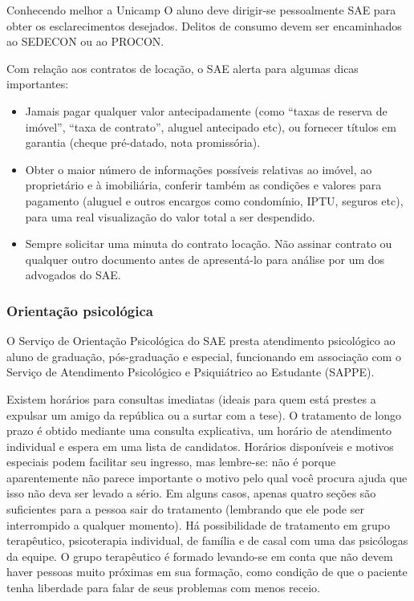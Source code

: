 \begin{story}{Conhecendo melhor a Unicamp}
O aluno deve dirigir-se pessoalmente SAE para obter os esclarecimentos desejados. Delitos de consumo devem ser encaminhados ao SEDECON ou ao PROCON.

Com relação aos contratos de locação, o SAE alerta para algumas dicas importantes:

\begin{itemize}
\item Jamais pagar qualquer valor antecipadamente (como ``taxas de reserva de imóvel'', ``taxa de contrato'', aluguel antecipado etc), ou fornecer títulos em garantia (cheque pré-datado, nota promissória).

\item Obter o maior número de informações possíveis relativas ao imóvel, ao proprietário e à imobiliária, conferir também as condições e valores para pagamento (aluguel e outros encargos como condomínio, IPTU, seguros etc), para uma real visualização do valor total a ser despendido.

\item Sempre solicitar uma minuta do contrato locação. Não assinar contrato ou qualquer outro documento antes de apresentá-lo para análise por um dos advogados do SAE.
\end{itemize}

\subsubsection*{Orientação psicológica}

O Serviço de Orientação Psicológica do SAE presta atendimento psicológico ao aluno de graduação, pós-graduação e especial, funcionando em associação com o Serviço de Atendimento Psicológico e Psiquiátrico ao Estudante (SAPPE).

Existem horários para consultas imediatas (ideais para quem está prestes a expulsar um amigo da república ou a surtar com a tese). O tratamento de longo prazo é obtido mediante uma consulta explicativa, um horário de atendimento individual e espera em uma lista de candidatos. Horários disponíveis e motivos especiais podem facilitar seu ingresso, mas lembre-se: não é porque aparentemente não parece importante o motivo pelo qual você procura ajuda que isso não deva ser levado a sério. Em alguns casos, apenas quatro seções são suficientes para a pessoa sair do tratamento (lembrando que ele pode ser interrompido a qualquer momento). Há possibilidade de tratamento em grupo terapêutico, psicoterapia individual, de família e de casal com uma das psicólogas da equipe. O grupo terapêutico é formado levando-se em conta que não devem haver pessoas muito próximas em sua formação, como condição de que o paciente tenha liberdade para falar de seus problemas com menos receio.


\end{story}
